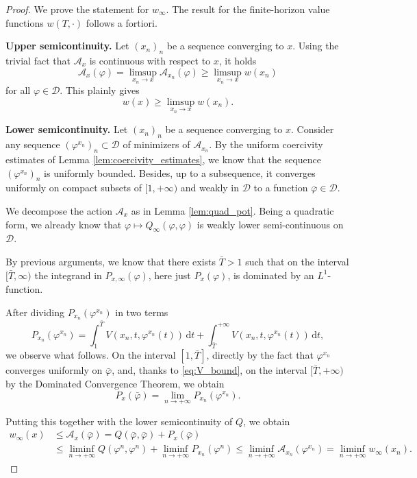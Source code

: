 \documentclass[a4paper,10pt]{amsart}
\newcommand{\ud}{\mathrm{d}}
\theoremstyle{plain}
\theoremstyle{definition}
\numberwithin{equation}{section}
\numberwithin{thm}{section}
\begin{document}
\begin{proof}

We prove the statement for $w_\infty$. The result for the finite-horizon value functions $w(T,\cdot)$ follows a fortiori.

\textbf{Upper semicontinuity.}
Let $(x_n)_n$ be a sequence converging to $x$. Using the trivial fact that $\mathcal A_x$ is continuous with respect to $x$, it holds
\[
\mathcal{A}_x(\varphi) = \limsup_{x_n\rightarrow x}\mathcal{A}_{x_n}(\varphi) \geq \limsup_{x_n\rightarrow x} w(x_n)
\]
for all $\varphi\in\mathcal{D}$. This plainly gives
\[
w(x)\geq \limsup_{x_n\rightarrow x}w(x_n).
\]


\textbf{Lower semicontinuity.}
Let $(x_n)_n$ be a sequence converging to $x$. Consider any sequence $(\varphi^{x_n})_n\subset\mathcal{D}$ of minimizers of $\mathcal{A}_{x_n}$. By the uniform coercivity estimates of Lemma  \ref{lem:coercivity_estimates}, we know that the sequence $(\varphi^{x_n})_n$ is uniformly bounded. Besides, up to a subsequence, it converges uniformly on compact subsets of $[1,+\infty)$ and weakly in $\mathcal D$ to a function $\bar\varphi\in\mathcal{D}$. 

We decompose the action $\mathcal{A}_x$ as in Lemma \ref{lem:quad_pot}. Being a quadratic form, we already know that $\varphi\mapsto Q_\infty(\varphi,\varphi)$ is weakly lower semi-continuous on $\mathcal{D}$.

By previous arguments, we know that there exists $\bar T>1$ such that on the interval $[\bar T,\infty)$ the integrand in $P_{x,\infty}(\varphi)$, here just $P_x(\varphi)$, is dominated by an $L^1$-function. 

After dividing $P_{x_n}(\varphi^{x_n})$ in two terms
\[
P_{x_n}(\varphi^{x_n})=\int_{1}^{\bar T} V(x_n,t,\varphi^{x_n}(t))\,\ud t + \int_{\bar T}^{+\infty} V(x_n,t,\varphi^{x_n}(t))\,\ud t,
\]
we observe what follows. On the interval $[1,\bar T]$, directly by the fact that $\varphi^{x_n}$ converges uniformly on $\bar \varphi$, and, thanks to \eqref{eq:V_bound}, on the interval $[\bar T,+\infty)$ by the Dominated Convergence Theorem, we obtain
\[
P_{x}(\bar\varphi) = \lim_{n\rightarrow+\infty} P_{x_n}(\varphi^{x_n}).
\]

Putting this together with the lower semicontinuity of $Q$, we obtain
\[
\begin{split}
w_\infty(x) & \le \mathcal{A}_x(\bar\varphi) = Q(\bar\varphi,\bar\varphi) +P_{x}(\bar\varphi)
\\
&\leq\liminf_{n\to+\infty} Q(\varphi^n,\varphi^n) +\liminf_{n\to+\infty}  P_{x_n}(\varphi^n)\leq \liminf_{n\rightarrow+\infty}\mathcal{A}_{x_n}(\varphi^{x_n}) = \liminf_{n\rightarrow+\infty}w_\infty(x_n).\end{split}
\]
\end{proof}
\end{document}
